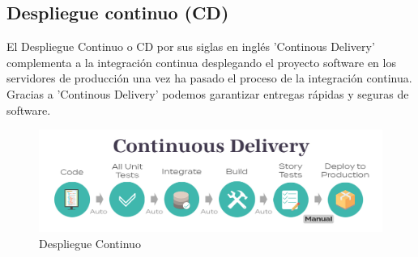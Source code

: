 	\subsection{Despliegue continuo (CD)}
		\begin{text}
			El Despliegue Continuo o CD por sus siglas en inglés 'Continous Delivery' complementa a la integración continua desplegando el proyecto software en los servidores de producción una vez ha pasado el proceso de la integración continua. Gracias a 'Continous Delivery' podemos garantizar entregas rápidas y seguras de software.
			
			\begin{figure}[!hbt]
				\centering
				\includegraphics[scale=0.35]{imagenes/Introduccion/Conceptos_Basicos/CD.png}
				\caption[Despliegue Continuo]{Despliegue Continuo \cite{continuo84:online}}
				\label{despligue_continuo} 
			\end{figure}
		\end{text}
